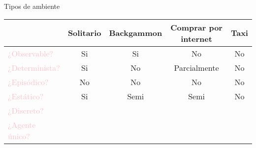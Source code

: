 
    \begin{frame}{Tipos de ambiente}
        \begin{center}
        \begin{tabular}{|l|c|c|c|c|} \hline
                \multicolumn{1}{|p{2cm}|}{\centering }
              & \multicolumn{1}{p{1.3cm}|}{\centering Solitario}
              & \multicolumn{1}{p{2.1cm}|}{\centering Backgammon}
              & \multicolumn{1}{p{3.4cm}|}{\centering Comprar por internet}
              & \multicolumn{1}{p{0.7cm}|}{\centering Taxi}
                \tabularnewline \hline
                \textcolor{Pink}{¿Observable?} & Si & Si & No & No \\
                \textcolor{Pink}{¿Determinista?} & Si & No & Parcialmente & No \\
                \textcolor{Pink}{¿Episódico?} & No & No & No & No \\
                \textcolor{Pink}{¿Estático?} & Si & Semi & Semi & No \\
                \textcolor{Pink}{¿Discreto?} &  &  & &  \\
                \textcolor{Pink}{¿Agente único?} &  &  &  &  \\ \hline
        \end{tabular}
        \end{center}
    \end{frame}
